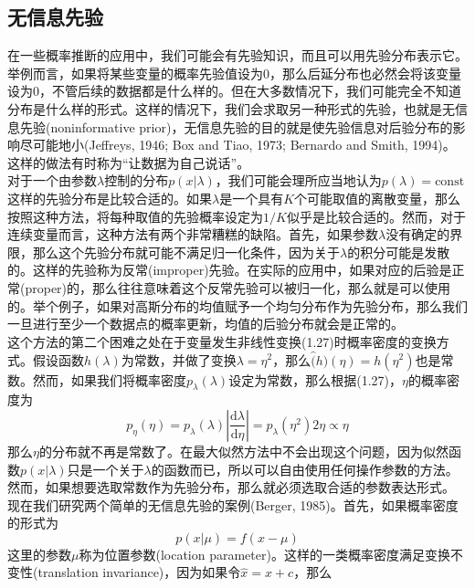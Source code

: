 \documentclass[b5paper]{book}
\numberwithin{equation}{chapter}
\begin{document}
	\subsection{无信息先验}
	\textnormal{
	在一些概率推断的应用中，我们可能会有先验知识，而且可以用先验分布表示它。举例而言，如果将某些变量的概率先验值设为0，那么后延分布也必然会将该变量设为0，不管后续的数据都是什么样的。但在大多数情况下，我们可能完全不知道分布是什么样的形式。这样的情况下，我们会求取另一种形式的先验，也就是无信息先验(noninformative prior)，无信息先验的目的就是使先验信息对后验分布的影响尽可能地小(Jeffreys, 1946; Box and Tiao, 1973; Bernardo and Smith, 1994)。这样的做法有时称为“让数据为自己说话”。\\
	\indent 对于一个由参数$\lambda$控制的分布$p(x|\lambda)$，我们可能会理所应当地认为$p(\lambda)=\mathrm{const}$这样的先验分布是比较合适的。如果$\lambda$是一个具有$K$个可能取值的离散变量，那么按照这种方法，将每种取值的先验概率设定为$1/K$似乎是比较合适的。然而，对于连续变量而言，这种方法有两个非常糟糕的缺陷。首先，如果参数$\lambda$没有确定的界限，那么这个先验分布就可能不满足归一化条件，因为关于$\lambda$的积分可能是发散的。这样的先验称为反常(improper)先验。在实际的应用中，如果对应的后验是正常(proper)的，那么往往意味着这个反常先验可以被归一化，那么就是可以使用的。举个例子，如果对高斯分布的均值赋予一个均匀分布作为先验分布，那么我们一旦进行至少一个数据点的概率更新，均值的后验分布就会是正常的。\\
	\indent 这个方法的第二个困难之处在于变量发生非线性变换(1.27)时概率密度的变换方式。假设函数$h(\lambda)$为常数，并做了变换$\lambda = \eta^2$，那么$\hat(h)(\eta)=h(\eta^2)$也是常数。然而，如果我们将概率密度$p_{\lambda}(\lambda)$设定为常数，那么根据(1.27)，$\eta$的概率密度为
	\begin{equation}
		p_{\eta}(\eta)=p_{\lambda}(\lambda)\left|\frac{\mathrm{d}{\lambda}}{\mathrm{d}{\eta}}\right| = p_{\lambda}(\eta^2)2\eta \propto \eta
	\end{equation}
	那么$\eta$的分布就不再是常数了。在最大似然方法中不会出现这个问题，因为似然函数$p(x|\lambda)$只是一个关于$\lambda$的函数而已，所以可以自由使用任何操作参数的方法。然而，如果想要选取常数作为先验分布，那么就必须选取合适的参数表达形式。\\
	\indent 现在我们研究两个简单的无信息先验的案例(Berger, 1985)。首先，如果概率密度的形式为
	\begin{equation}
		p(x|\mu)=f(x-\mu)
	\end{equation}
	这里的参数$\mu$称为位置参数(location parameter)。这样的一类概率密度满足变换不变性(translation invariance)，因为如果令$\hat{x}=x+c$，那么
}
\end{document}
